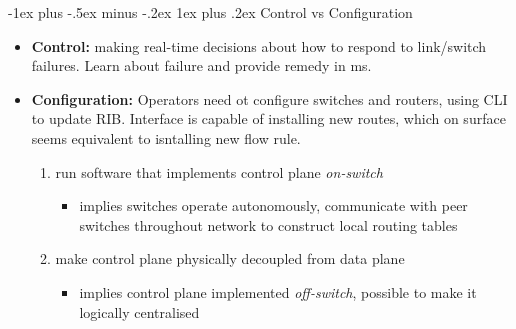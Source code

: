 \documentclass[10pt,landscape]{article}
\makeatletter
\newcommand{\subsubsubsection}{\@startsection{subsubsection}{3}{0mm}%
                                {-1ex plus -.5ex minus -.2ex}%
                                {1ex plus .2ex}%
                                {\normalfont\scriptsize\bfseries}}
\makeatother
\begin{document}
\begin{multicols*}{3}
\subsubsubsection{Control vs Configuration}
\begin{itemize}[topsep=0pt,noitemsep,wide=0pt, leftmargin=\dimexpr{} + 2\relax]
  \item \textbf{Control:} making real-time decisions about how to respond to link/switch failures. Learn about failure and provide remedy in ms.
  \item \textbf{Configuration:} Operators need ot configure switches and routers, using CLI to update RIB. Interface is capable of installing new routes, which on surface seems equivalent to isntalling new flow rule.
  \begin{enumerate}[topsep=0pt,noitemsep,wide=0pt, leftmargin=\dimexpr\labelwidth + 2\labelsep\relax]
    \item run software that implements control plane \textit{on-switch}
    \begin{itemize}[topsep=0pt,noitemsep,wide=0pt, leftmargin=\dimexpr{} + 2\relax]
      \item implies switches operate autonomously, communicate with peer switches throughout network to construct local routing tables
    \end{itemize}
    \item make control plane physically decoupled from data plane
    \begin{itemize}[topsep=0pt,noitemsep,wide=0pt, leftmargin=\dimexpr{} + 2\relax]
      \item implies control plane implemented \textit{off-switch}, possible to make it logically centralised
    \end{itemize}
  \end{enumerate}
\end{itemize}


\end{multicols*}
\end{document}
